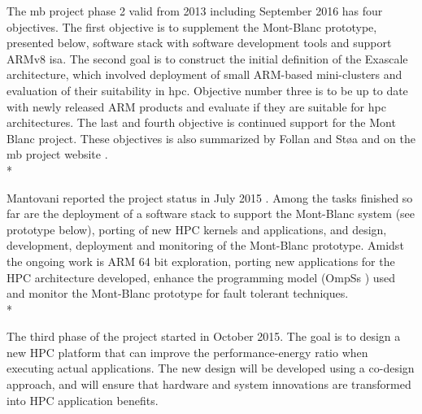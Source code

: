 The \gls{mb} project phase 2 valid from 2013 including September 2016 has four objectives. The first objective is to supplement the Mont-Blanc prototype, presented below, software stack with software development tools and support ARMv8 \gls{isa}. The second goal is to construct the initial definition of the Exascale architecture, which involved deployment of small ARM-based mini-clusters and evaluation of their suitability in \gls{hpc}. Objective number three is to be up to date with newly released ARM products and evaluate if they are suitable for \gls{hpc} architectures. The last and fourth objective is continued support for the Mont Blanc project. These objectives is also summarized by Follan and Støa \cite{mt:T&S} and on the \gls{mb} project website \cite{MB}.\\*

Mantovani reported the project status in July 2015 \cite{p:MB-15}. Among the tasks finished so far are the deployment of a software stack to support the Mont-Blanc system (see prototype below), porting of new HPC kernels and applications, and design, development, deployment and monitoring of the Mont-Blanc prototype. Amidst the ongoing work is ARM 64 bit exploration, porting new applications for the HPC architecture developed, enhance the programming model (OmpSs \cite{OMPSS}) used and monitor the Mont-Blanc prototype for fault tolerant techniques. \\*

The third phase of the project started in October 2015. The goal is to design a new HPC platform that can improve the performance-energy ratio when executing actual applications. The new design will be developed using a co-design approach, and will ensure that hardware and system innovations are transformed into HPC application benefits.


